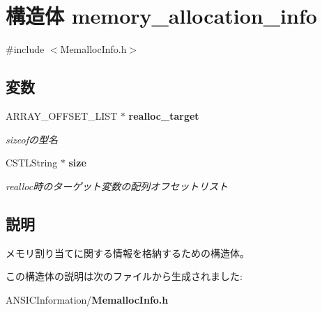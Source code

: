 \section{構造体 memory\_\-allocation\_\-info}
\label{structmemory__allocation__info}


{\ttfamily \#include $<$MemallocInfo.h$>$}

\subsection*{変数}
\begin{DoxyCompactItemize}
\item 
ARRAY\_\-OFFSET\_\-LIST $\ast$ {\bf realloc\_\-target}\label{structmemory__allocation__info_af1edaa8634179c3185a37cb1518e4fde}

\begin{DoxyCompactList}\small\item\em sizeofの型名 \item\end{DoxyCompactList}\item 
CSTLString $\ast$ {\bf size}\label{structmemory__allocation__info_a0ad96160d67dbf835dd7d599ece0d9b4}

\begin{DoxyCompactList}\small\item\em realloc時のターゲット変数の配列オフセットリスト \item\end{DoxyCompactList}\end{DoxyCompactItemize}


\subsection{説明}
メモリ割り当てに関する情報を格納するための構造体。 

この構造体の説明は次のファイルから生成されました:\begin{DoxyCompactItemize}
\item 
ANSICInformation/{\bf MemallocInfo.h}\end{DoxyCompactItemize}
